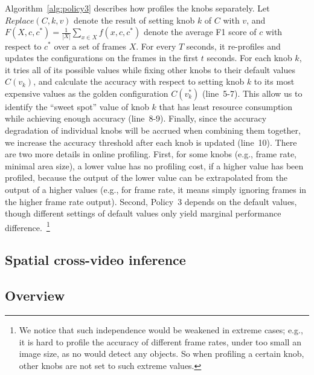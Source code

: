 Algorithm~\ref{alg:policy3} describes how \name profiles the knobs
separately. 
Let $Replace(C,k,v)$ denote the result of setting knob $k$ of $C$ 
with $v$, and $F(X,c,c^*)=\frac{1}{|X|}\sum_{x\in X}f(x,c,c^*)$ 
denote the average F1 score of $c$ with respect to $c^*$ over a 
set of frames $X$.
For every $T$ seconds, it re-profiles and updates the 
configurations on the frames in the first $t$ seconds.
For each knob $k$, it tries all of its possible values while 
fixing other knobs to their default values $C(v_k)$, and calculate
the accuracy with respect to setting knob $k$ to its most 
expensive values as the golden
configuration $C(v_k^*)$ (line~5-7). 
This allow us to identify the ``sweet spot'' value of knob $k$ 
that has least resource consumption while achieving enough 
accuracy (line~8-9).
Finally, since the accuracy degradation of individual knobs will 
be accrued when combining them together, we increase the accuracy 
threshold after each knob is updated (line~10).
There are two more details in online profiling.
First, for some knobs (e.g., frame rate, minimal area size), a
lower value has no profiling cost, if a higher value has been
profiled, because the output of the lower value can be extrapolated
from the output of a higher values (e.g., for frame rate, it means
simply ignoring frames in the higher frame rate output).
Second, Policy~3 depends on the default values, though different
settings of default values only yield marginal performance 
difference.~\footnote{We notice that such independence would be 
weakened in extreme cases; e.g., it is hard to profile the accuracy
of different frame rates, under too small an image size, as no \nn
would detect any objects. So when profiling a certain knob, other
knobs are not set to such extreme values.}


\subsection{Spatial cross-video inference}








\subsection{Overview}

